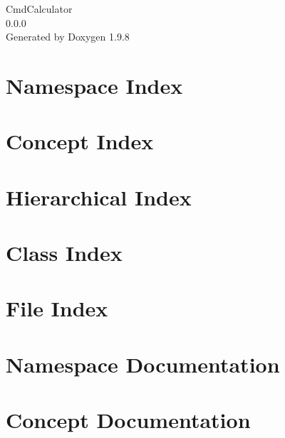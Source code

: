 \documentclass[twoside]{book}
\newcommand{\+}{\discretionary{\mbox{\scriptsize$\hookleftarrow$}}{}{}}
\newcommand{\clearemptydoublepage}{%
    \newpage{\pagestyle{empty}\cleardoublepage}%
  }
\begin{document}
  \raggedbottom
    \hypersetup{pageanchor=false,
                bookmarksnumbered=true,
                pdfencoding=unicode
               }
  \begin{titlepage}
  \vspace*{7cm}
  \begin{center}%
  {\Large Cmd\+Calculator}\\
  [1ex]\large 0.\+0.\+0 \\
  \vspace*{1cm}
  {\large Generated by Doxygen 1.9.8}\\
  \end{center}
  \end{titlepage}
  \clearemptydoublepage
  \tableofcontents
  \clearemptydoublepage
  \hypersetup{pageanchor=true}
\chapter{Namespace Index}

\chapter{Concept Index}

\chapter{Hierarchical Index}

\chapter{Class Index}

\chapter{File Index}

\chapter{Namespace Documentation}



\chapter{Concept Documentation}














\end{document}

